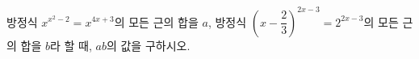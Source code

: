 방정식 $x^{x^{2}-2}=x^{4x+3}$의 모든 근의 합을 $a$, 방정식 $\left(x-\dfrac{2}{3}\right)^{2x-3}=2^{2x-3}$의 모든 근의 합을 $b$라 할 때, $ab$의 값을 구하시오. 
